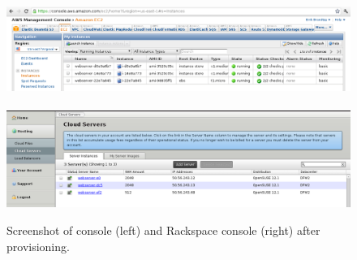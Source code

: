 \begin{figure}[tb]
  \begin{center}
    \includegraphics[width=20cm, angle=90]{imgs/aws-console.png}
    ~ ~ ~
    ~ ~ ~
    \includegraphics[width=20cm, angle=90]{imgs/rackspace-console.png}
    \caption{Screenshot of  console (left) and Rackspace console (right) after provisioning.}
  \end{center}
  \label{fig:validation-consoles}
\end{figure}
